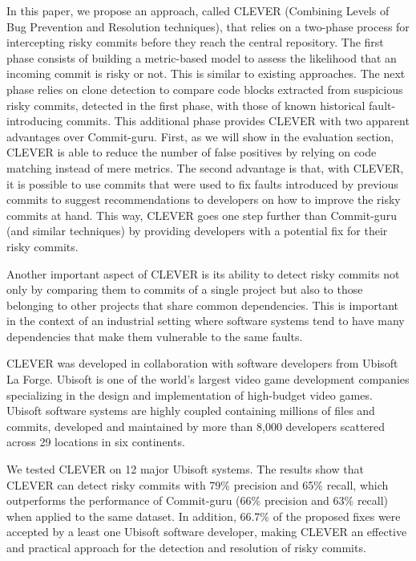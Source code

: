 \documentclass[sigconf]{acmart}
\begin{document}
In this paper, we propose an approach, called CLEVER (Combining Levels
of Bug Prevention and Resolution techniques), that relies on a two-phase
process for intercepting risky commits before they reach the central
repository. The first phase consists of building a metric-based model to
assess the likelihood that an incoming commit is risky or not. This is
similar to existing approaches. The next phase relies on clone detection
to compare code blocks extracted from suspicious risky commits, detected
in the first phase, with those of known historical fault-introducing
commits. This additional phase provides CLEVER with two apparent
advantages over Commit-guru. First, as we will show in the evaluation
section, CLEVER is able to reduce the number of false positives by
relying on code matching instead of mere metrics. The second advantage
is that, with CLEVER, it is possible to use commits that were used to
fix faults introduced by previous commits to suggest recommendations to
developers on how to improve the risky commits at hand. This way, CLEVER
goes one step further than Commit-guru (and similar techniques) by
providing developers with a potential fix for their risky commits.

Another important aspect of CLEVER is its ability to detect risky
commits not only by comparing them to commits of a single project but
also to those belonging to other projects that share common
dependencies. This is important in the context of an industrial setting
where software systems tend to have many dependencies that make them
vulnerable to the same faults.

CLEVER was developed in collaboration with software developers from
Ubisoft La Forge. Ubisoft is one of the world's largest video game
development companies specializing in the design and implementation of
high-budget video games. Ubisoft software systems are highly coupled
containing millions of files and commits, developed and maintained by
more than 8,000 developers scattered across 29 locations in six
continents.

We tested CLEVER on 12 major Ubisoft systems. The results show that
CLEVER can detect risky commits with 79\% precision and 65\% recall,
which outperforms the performance of Commit-guru (66\% precision and
63\% recall) when applied to the same dataset. In addition, 66.7\% of
the proposed fixes were accepted by a least one Ubisoft software
developer, making CLEVER an effective and practical approach for the
detection and resolution of risky commits.
\end{document}
